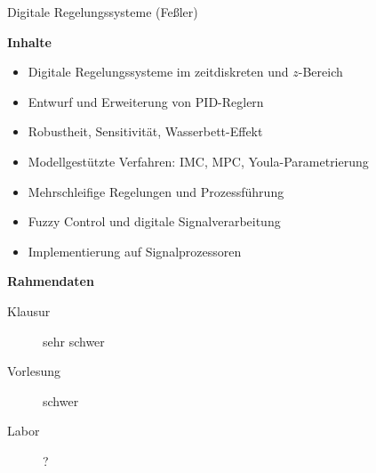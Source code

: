 \begin{frame}{Digitale Regelungssysteme (Feßler)}

\textbf{Inhalte}
\begin{itemize}
    \item Digitale Regelungssysteme im zeitdiskreten und $z$-Bereich
    \item Entwurf und Erweiterung von PID-Reglern
    \item Robustheit, Sensitivität, Wasserbett-Effekt
    \item Modellgestützte Verfahren: IMC, MPC, Youla-Parametrierung
    \item Mehrschleifige Regelungen und Prozessführung
    \item Fuzzy Control und digitale Signalverarbeitung
    \item Implementierung auf Signalprozessoren
\end{itemize}

\vspace{0.3cm}
\textbf{Rahmendaten}
\begin{description}
    \item[Klausur] sehr schwer
    \item[Vorlesung] schwer
    \item[Labor] ?
\end{description}

\end{frame}



